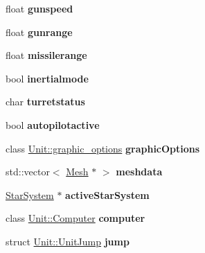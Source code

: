 \begin{DoxyCompactItemize}
\item 
float {\bfseries gunspeed}\hypertarget{classUnit_a43f45d571cef8f25b1f9d6ccd93f1223}{}\label{classUnit_a43f45d571cef8f25b1f9d6ccd93f1223}

\item 
float {\bfseries gunrange}\hypertarget{classUnit_ad0e0702e61346fd30373baf96ac4b722}{}\label{classUnit_ad0e0702e61346fd30373baf96ac4b722}

\item 
float {\bfseries missilerange}\hypertarget{classUnit_a7aace45f42b1f9a1afda5fdcd37e4470}{}\label{classUnit_a7aace45f42b1f9a1afda5fdcd37e4470}

\item 
bool {\bfseries inertialmode}\hypertarget{classUnit_a5416abd192e4e9909f449fd4a866539a}{}\label{classUnit_a5416abd192e4e9909f449fd4a866539a}

\item 
char {\bfseries turretstatus}\hypertarget{classUnit_a757fcef8d2ddbf6d4184b133529fe668}{}\label{classUnit_a757fcef8d2ddbf6d4184b133529fe668}

\item 
bool {\bfseries autopilotactive}\hypertarget{classUnit_ae28916b165d9035edb06527ed76fe07e}{}\label{classUnit_ae28916b165d9035edb06527ed76fe07e}

\item 
class \hyperlink{classUnit_1_1graphic__options}{Unit\+::graphic\+\_\+options} {\bfseries graphic\+Options}\hypertarget{classUnit_a4a8c39c7edfa27d1ab7b38e3b282ba5a}{}\label{classUnit_a4a8c39c7edfa27d1ab7b38e3b282ba5a}

\item 
std\+::vector$<$ \hyperlink{classMesh}{Mesh} $\ast$ $>$ {\bfseries meshdata}\hypertarget{classUnit_ac17cd3c77909d1eb911e53c07fe83a79}{}\label{classUnit_ac17cd3c77909d1eb911e53c07fe83a79}

\item 
\hyperlink{classStarSystem}{Star\+System} $\ast$ {\bfseries active\+Star\+System}\hypertarget{classUnit_a817e0c8cd6ab05ba05e61ecf527e1605}{}\label{classUnit_a817e0c8cd6ab05ba05e61ecf527e1605}

\item 
class \hyperlink{classUnit_1_1Computer}{Unit\+::\+Computer} {\bfseries computer}\hypertarget{classUnit_ae95bd950f1c3b354f86cfb0dede01fe9}{}\label{classUnit_ae95bd950f1c3b354f86cfb0dede01fe9}

\item 
struct \hyperlink{structUnit_1_1UnitJump}{Unit\+::\+Unit\+Jump} {\bfseries jump}\hypertarget{classUnit_aa068bf1e95cb8837ab2f5e0658f1f99e}{}\label{classUnit_aa068bf1e95cb8837ab2f5e0658f1f99e}


\end{DoxyCompactItemize}
